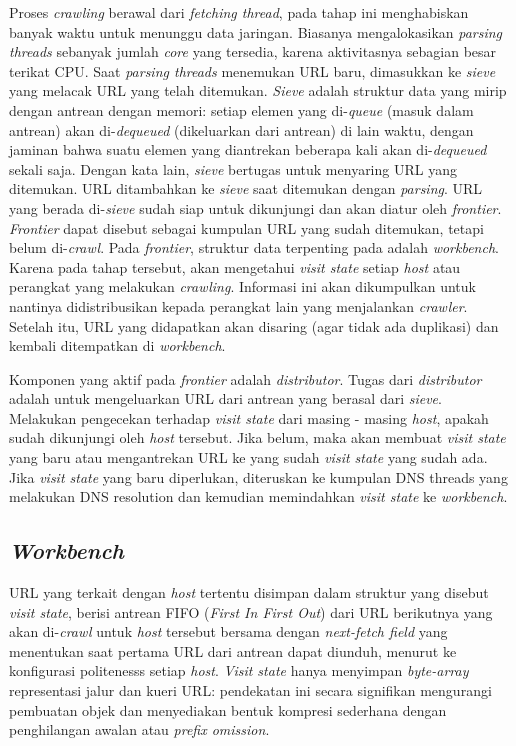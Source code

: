 Proses \emph{crawling} berawal dari \emph{fetching thread}, pada tahap ini menghabiskan banyak waktu untuk menunggu data jaringan. Biasanya mengalokasikan \emph{parsing threads} sebanyak jumlah \emph{core} yang tersedia, karena aktivitasnya sebagian besar terikat CPU. Saat \emph{parsing threads} menemukan URL baru, dimasukkan ke \emph{sieve} yang melacak URL yang telah ditemukan. \emph{Sieve} adalah struktur data yang mirip dengan antrean dengan memori: setiap elemen yang di-\emph{queue} (masuk dalam antrean) akan di-\emph{dequeued} (dikeluarkan dari antrean) di lain waktu, dengan jaminan bahwa suatu elemen yang diantrekan beberapa kali akan di-\emph{dequeued} sekali saja. Dengan kata lain, \emph{sieve} bertugas untuk menyaring URL yang ditemukan. URL ditambahkan ke \emph{sieve} saat ditemukan dengan \emph{parsing}. URL yang berada di-\emph{sieve} sudah siap untuk dikunjungi dan akan diatur oleh \emph{frontier}. \emph{Frontier} dapat disebut sebagai kumpulan URL yang sudah ditemukan, tetapi belum di-\emph{crawl}. Pada \emph{frontier}, struktur data terpenting pada adalah \emph{workbench}. Karena pada tahap tersebut, akan mengetahui \emph{visit state} setiap \emph{host} atau perangkat yang melakukan \emph{crawling}. Informasi ini akan dikumpulkan untuk nantinya didistribusikan kepada perangkat lain yang menjalankan \emph{crawler}. Setelah itu, URL yang didapatkan akan disaring (agar tidak ada duplikasi) dan kembali ditempatkan di \emph{workbench}.

Komponen yang aktif pada \emph{frontier} adalah \emph{distributor}. Tugas dari \emph{distributor} adalah untuk mengeluarkan URL dari antrean yang berasal dari \emph{sieve}. Melakukan pengecekan terhadap \emph{visit state} dari masing - masing \emph{host}, apakah sudah dikunjungi oleh \emph{host} tersebut. Jika belum, maka akan membuat \emph{visit state} yang baru atau mengantrekan URL ke yang sudah \emph{visit state} yang sudah ada. Jika \emph{visit state} yang baru diperlukan, diteruskan ke kumpulan DNS threads yang melakukan DNS resolution dan kemudian memindahkan \emph{visit state} ke \emph{workbench}.

\subsection{\emph{Workbench}}

URL yang terkait dengan \emph{host} tertentu disimpan dalam struktur yang disebut \emph{visit state}, berisi antrean FIFO (\emph{First In First Out}) dari URL berikutnya yang akan di-\emph{crawl} untuk \emph{host} tersebut bersama dengan \emph{next-fetch field} yang menentukan saat pertama URL dari antrean dapat diunduh, menurut ke konfigurasi politenesss setiap \emph{host}. \emph{Visit state} hanya menyimpan \emph{byte-array} representasi jalur dan kueri URL: pendekatan ini secara signifikan mengurangi pembuatan objek dan menyediakan bentuk kompresi sederhana dengan penghilangan awalan atau \emph{prefix omission}.

